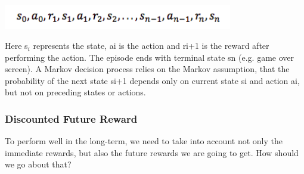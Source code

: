 \documentclass[a4paper,11pt]{article}
\begin{document}
				\begin{centering}
				\includegraphics[width=10cm]{../Design/images/mdp2.png}\\
				\end{centering}

				Here s$_{i}$ represents the state, ai is the action and ri+1 is the reward after performing the action. The episode ends with terminal state sn (e.g. game over screen). A Markov decision process relies on the Markov assumption, that the probability of the next state si+1 depends only on current state si and action ai, but not on preceding states or actions.
			\subsubsection{Discounted Future Reward}
				To perform well in the long-term, we need to take into account not only the immediate rewards, but also the future rewards we are going to get. How should we go about that?
\end{document}
